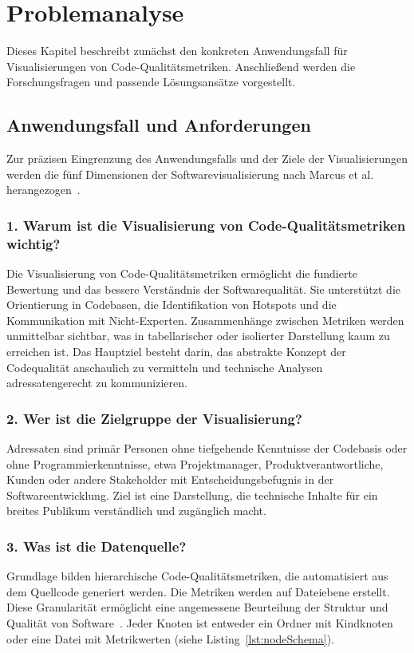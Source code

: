 \chapter{Problemanalyse} \label{sec:Problemanalyse}

Dieses Kapitel beschreibt zunächst den konkreten Anwendungsfall für Visualisierungen von Code-Qualitätsmetriken. Anschließend werden die Forschungsfragen und passende Lösungsansätze vorgestellt.

\section{Anwendungsfall und Anforderungen} \label{sec:Anwendungsfall}

Zur präzisen Eingrenzung des Anwendungsfalls und der Ziele der Visualisierungen werden die fünf Dimensionen der Softwarevisualisierung nach Marcus et al. herangezogen~\cite{3dsoftwareMarcus}.

\subsection*{1. Warum ist die Visualisierung von Code-Qualitätsmetriken wichtig?}
Die Visualisierung von Code-Qualitätsmetriken ermöglicht die fundierte Bewertung und das bessere Verständnis der Softwarequalität. Sie unterstützt die Orientierung in Codebasen, die Identifikation von Hotspots und die Kommunikation mit Nicht-Experten. Zusammenhänge zwischen Metriken werden unmittelbar sichtbar, was in tabellarischer oder isolierter Darstellung kaum zu erreichen ist. Das Hauptziel besteht darin, das abstrakte Konzept der Codequalität anschaulich zu vermitteln und technische Analysen adressatengerecht zu kommunizieren.

\subsection*{2. Wer ist die Zielgruppe der Visualisierung?}
Adressaten sind primär Personen ohne tiefgehende Kenntnisse der Codebasis oder ohne Programmierkenntnisse, etwa Projektmanager, Produktverantwortliche, Kunden oder andere Stakeholder mit Entscheidungsbefugnis in der Softwareentwicklung. Ziel ist eine Darstellung, die technische Inhalte für ein breites Publikum verständlich und zugänglich macht.

\subsection*{3. Was ist die Datenquelle?}
Grundlage bilden hierarchische Code-Qualitätsmetriken, die automatisiert aus dem Quellcode generiert werden. Die Metriken werden auf Dateiebene erstellt. Diese Granularität ermöglicht eine angemessene Beurteilung der Struktur und Qualität von Software~\cite{codeCity1}. Jeder Knoten ist entweder ein Ordner mit Kindknoten oder eine Datei mit Metrikwerten (siehe Listing~\ref{lst:nodeSchema}).

